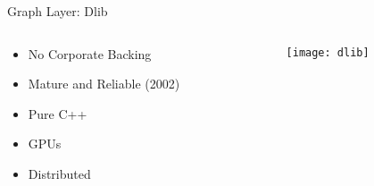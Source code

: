 \begin{slide}{Graph Layer: Dlib}
  \begin{columns}
    \begin{column}{0.5\textwidth}
      \begin{itemize}
        \item No Corporate Backing
        \item Mature and Reliable (2002)
        \item Pure C++ \cmark
        \item GPUs \cmark
        \item Distributed \xmark
      \end{itemize}
    \end{column}
    \begin{column}{0.45\textwidth}
      \texttt{[image: dlib]}
    \end{column}
  \end{columns}
\end{slide}

%
%
